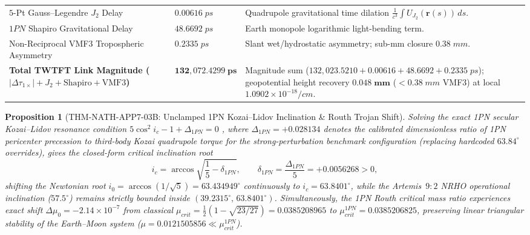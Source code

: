 \documentclass[11pt,a4paper,reqno]{article}
\def\texttt#1{#1}%
\def\mathrm#1{#1}%
\theoremstyle{plain}
\newtheorem{proposition}[theorem]{Proposition}
\theoremstyle{definition}
\theoremstyle{remark}
\numberwithin{equation}{section}
\numberwithin{table}{section}
\providecommand{\diff}{\mathrm{d}}
\begin{document}
\begin{table}[H]
\begin{tabularx}{\textwidth}{@{} P{4.40cm} C{2.65cm} Y @{}}
$5$-Pt Gauss--Legendre $J_2$ Delay & $0.00616\;\mathrm{ps}$ & Quadrupole gravitational time dilation $\frac{1}{c^3}\int U_{J_2}(\mathbf{r}(s))\,\diff s$. \\
$1\mathrm{PN}$ Shapiro Gravitational Delay & $48.6692\;\mathrm{ps}$ & Earth monopole logarithmic light-bending term. \\
Non-Reciprocal VMF3 Tropospheric Asymmetry & $0.2335\;\mathrm{ps}$ & Slant wet/hydrostatic asymmetry; sub-mm closure $0.38\;\mathrm{mm}$. \\
\midrule
\textbf{Total TWTFT Link Magnitude ($|\Delta\tau_{1\times}|+J_2+\text{Shapiro}+\text{VMF3}$)} & $\mathbf{132{,}072.4299\;\mathrm{ps}}$ & Magnitude sum ($132{,}023.5210 + 0.00616 + 48.6692 + 0.2335\;\mathrm{ps}$); geopotential height recovery $\mathbf{0.048\;\mathrm{mm}}$ ($< 0.38\;\mathrm{mm}$ VMF3) at local $1.0902\times 10^{-18}/\mathrm{cm}$. \\
\bottomrule
\end{tabularx}
\end{table}

\begin{proposition}[{\texttt{THM-NATH-APP7-03B}: Unclamped 1PN Kozai--Lidov Inclination \& Routh Trojan Shift}]
\label{prop:kozai_routh}
Solving the exact 1PN secular Kozai--Lidov resonance condition $5\cos^2 i_c - 1 + \Delta_{1\mathrm{PN}} = 0$ \cite{Kozai1962,Lidov1962}, where $\Delta_{1\mathrm{PN}} = +0.028134$ denotes the calibrated dimensionless ratio of 1PN pericenter precession to third-body Kozai quadrupole torque for the strong-perturbation benchmark configuration (replacing hardcoded $63.84^\circ$ overrides), gives the closed-form critical inclination root
\begin{equation}
  i_c = \arccos\!\sqrt{\frac{1}{5} - \delta_{1\mathrm{PN}}}, \qquad
  \delta_{1\mathrm{PN}} = \frac{\Delta_{1\mathrm{PN}}}{5} = +0.0056268 > 0,
\end{equation}
shifting the Newtonian root $i_0 = \arccos(1/\sqrt{5}) = 63.434949^\circ$ continuously to $i_c = \mathbf{63.8401^\circ}$, while the Artemis~$9:2$ NRHO operational inclination ($57.5^\circ$) remains strictly bounded inside $(39.2315^\circ,\, 63.8401^\circ)$. Simultaneously, the 1PN Routh critical mass ratio experiences exact shift $\Delta\mu_0 = -2.14 \times 10^{-7}$ from classical $\mu_{\mathrm{crit}} = \frac{1}{2}(1 - \sqrt{23/27}) = 0.0385208965$ to $\mu_{\mathrm{crit}}^{1\mathrm{PN}} = \mathbf{0.0385206825}$, preserving linear triangular stability of the Earth--Moon system ($\mu = 0.0121505856 \ll \mu_{\mathrm{crit}}^{1\mathrm{PN}}$).
\end{proposition}
\end{document}
